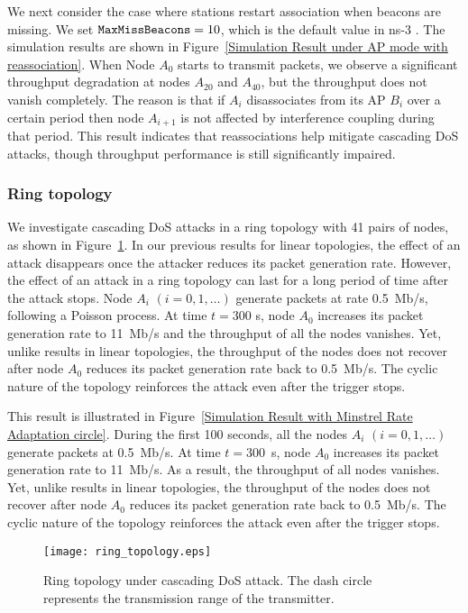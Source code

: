 \documentclass{IEEEtran}
\begin{document}
We next consider the case where stations restart association when beacons are missing. We set
${\tt MaxMissBeacons} = 10$, which is the default value in ns-3 \cite{ns3sta}. The simulation results are shown in Figure~\ref{Simulation Result under AP mode with reassociation}. When Node $A_0$ starts to transmit packets, we observe a significant throughput degradation at nodes $A_{20}$ and $A_{40}$, but
the throughput does not vanish completely. The reason is that if $A_i$ disassociates from its AP $B_i$ over a certain period
then node $A_{i+1}$ is not affected by interference coupling during that period. This result indicates that reassociations help mitigate cascading DoS attacks, though throughput performance is still significantly impaired.


\subsubsection{Ring topology}
\label{Ring topology}
We investigate cascading DoS attacks in a ring topology with 41 pairs of nodes, as shown in Figure~\ref{ring_topology}. In our previous results for
linear topologies, the effect of an attack disappears once the attacker reduces its packet generation rate. However, the effect of an attack in a
ring topology can last for a long period of time after the attack stops.
Node $A_i$ $(i = 0, 1, \dots)$ generate packets at rate 0.5~Mb/s, following a Poisson process. At time $t=300$ s, node $A_0$ increases its packet generation rate to 11~Mb/s and the
throughput of all the nodes vanishes. Yet, unlike results in linear topologies, the throughput of the nodes does not recover after node $A_0$
reduces its packet generation rate back to 0.5~Mb/s. The cyclic nature of the topology reinforces the attack even after the trigger stops.

This result is illustrated in Figure~\ref{Simulation Result with Minstrel Rate Adaptation circle}.
During the first 100 seconds, all the nodes $A_i$ $(i = 0, 1, \dots)$ generate packets at 0.5~Mb/s. At time $t=300$~s, node $A_0$ increases its packet generation
rate to 11~Mb/s. As a result, the throughput of all nodes vanishes. Yet, unlike results in linear topologies, the throughput of the nodes does not
recover
after node $A_0$ reduces its packet generation rate back to 0.5~Mb/s. The cyclic nature of the topology reinforces the attack even after the trigger
stops.

\begin{figure}[!t]
\centering
\texttt{[image: ring\_topology.eps]}
\caption{Ring topology under cascading DoS attack. The dash circle represents the transmission range of the transmitter.}
\label{ring_topology}
\end{figure}
\end{document}
